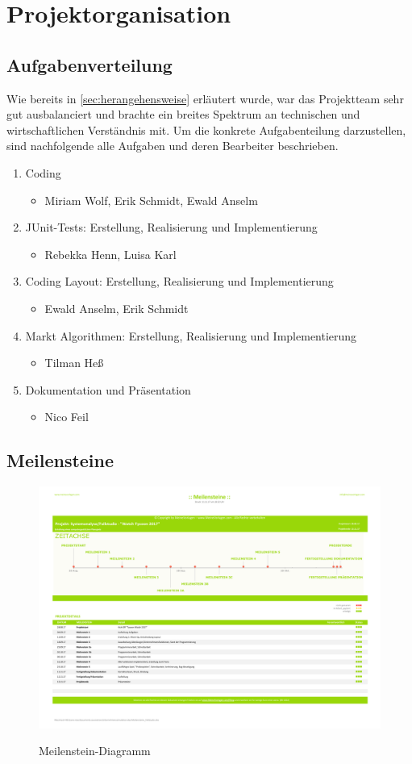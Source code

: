 \clearpage
\chapter{Projektorganisation}
\section{Aufgabenverteilung}
Wie bereits in \ref{sec:herangehensweise} erläutert wurde, war das Projektteam sehr gut ausbalanciert und brachte ein breites Spektrum an technischen und wirtschaftlichen Verständnis mit. Um die konkrete Aufgabenteilung darzustellen, sind nachfolgende alle Aufgaben und deren Bearbeiter beschrieben. 
\begin{enumerate}
	\item Coding
	\begin{itemize}
		\item Miriam Wolf, Erik Schmidt, Ewald Anselm
	\end{itemize} 
	\item JUnit-Tests: Erstellung, Realisierung und Implementierung
	\begin{itemize}
		\item Rebekka Henn, Luisa Karl
	\end{itemize} 
	\item Coding Layout: Erstellung, Realisierung und Implementierung
	\begin{itemize}
		\item Ewald Anselm, Erik Schmidt
	\end{itemize} 
	\item Markt Algorithmen: Erstellung, Realisierung und Implementierung
	\begin{itemize}
		\item Tilman Heß
	\end{itemize} 	
	\item Dokumentation und Präsentation
	\begin{itemize}
	\item Nico Feil
	\end{itemize}
\end{enumerate}
\clearpage
\section{Meilensteine}\label{sec:meilenstein}
\begin{figure}[!h]
	\centering
	\includegraphics[angle=90, scale=0.45]{img/Meilensteine_Fallstudie.pdf}
	\label{fig:abb}
	\caption{Meilenstein-Diagramm} 
\end{figure}
